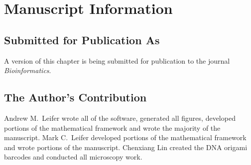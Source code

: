 \section{Manuscript Information}
\subsection{Submitted for Publication As}
A version of this chapter is being submitted for publication to the journal \textit{Bioinformatics}.

\subsection{The Author's Contribution}
Andrew M.~Leifer wrote all of the software, generated all figures, developed portions of the mathematical framework and wrote the majority of the manuscript. Mark C.~Leifer developed portions of the mathematical framework and wrote portions of the manuscript. Chenxiang Lin created the DNA origami barcodes and conducted all microscopy work. 
 